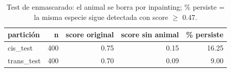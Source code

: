 \begin{table}[!htbp]
\centering
\small
\caption{Test de enmascarado: el animal se borra por inpainting; \% persiste = la misma especie sigue detectada con score $\geq$ 0.47.}
\label{tab:masktest}
\begin{tabular}{lrrrr}
\toprule
partición & n & score original & score sin animal & \% persiste \\
\midrule
cis\_test & 400 & 0.75 & 0.15 & 16.25 \\
trans\_test & 400 & 0.70 & 0.09 & 9.00 \\
\bottomrule
\end{tabular}
\end{table}
